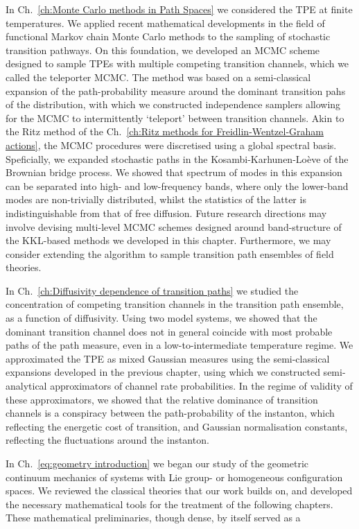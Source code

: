 \documentclass[]{cam-thesis}
\begin{document}
In Ch.~\ref{ch:Monte Carlo methods in Path Spaces} we considered the TPE at finite temperatures. We applied recent mathematical developments in the field of functional Markov chain Monte Carlo methods to the sampling of stochastic transition pathways. On this foundation, we developed an MCMC scheme designed to sample TPEs with multiple competing transition channels, which we called the teleporter MCMC. The method was based on a semi-classical expansion of the path-probability measure around the dominant transition pahs of the distribution, with which we constructed independence samplers allowing for the MCMC to intermittently `teleport' between transition channels. Akin to the Ritz method of the Ch.~\ref{ch:Ritz methods for Freidlin-Wentzel-Graham actions}, the MCMC procedures were discretised using a global spectral basis. Speficially, we expanded stochastic paths in the Kosambi-Karhunen-Lo\`eve of the Brownian bridge process. We showed that spectrum of modes in this expansion can be separated into high- and low-frequency bands, where only the lower-band modes are non-trivially distributed, whilst the statistics of the latter is indistinguishable from that of free diffusion. Future research directions may involve devising multi-level MCMC schemes designed around band-structure of the KKL-based methods we developed in this chapter. Furthermore, we may consider extending the algorithm to sample transition path ensembles of field theories. 

In Ch.~\ref{ch:Diffusivity dependence of transition paths} we studied the concentration of competing transition channels in the transition path ensemble, as a function of diffusivity. Using two model systems, we showed that the dominant transition channel does not in general coincide with most probable paths of the path measure, even in a low-to-intermediate temperature regime. We approximated the TPE as mixed Gaussian measures using the semi-classical expansions developed in the previous chapter, using which we constructed semi-analytical approximators of channel rate probabilities. In the regime of validity of these approximators, we showed that the relative dominance of transition channels is a conspiracy between the path-probability of the instanton, which reflecting the energetic cost of transition, and Gaussian normalisation constants, reflecting the fluctuations around the instanton.

In Ch.~\ref{eq:geometry introduction} we began our study of the geometric continuum mechanics of systems with Lie group- or homogeneous configuration spaces. We reviewed the classical theories that our work builds on, and developed the necessary mathematical tools for the treatment of the following chapters. These mathematical preliminaries, though dense, by itself served as a 
\end{document}
